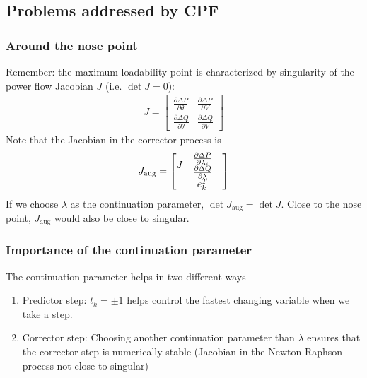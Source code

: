 \documentclass{beamer}
\begin{document}
\subsection{Problems addressed by CPF}


\begin{frame}
  \frametitle{Around the nose point}
Remember: the maximum loadability point is characterized by singularity of the power flow Jacobian $J$ (i.e. $\det J = 0$):
\begin{align}
  \label{eq:9}
  J = \begin{bmatrix}
  \frac{\partial \Delta P}{\partial \theta} & \frac{\partial \Delta P}{\partial V} \\
  \frac{\partial \Delta Q}{\partial \theta} & \frac{\partial \Delta Q}{\partial V}
  \end{bmatrix}
\end{align}
Note that the Jacobian in the corrector process is
\begin{align}
  \label{eq:9}
  J_\text{aug} = \begin{bmatrix}
  \begin{matrix} \vphantom{\begin{matrix} 0 \\ 0 \end{matrix}} 
  J 
 \end{matrix} & \begin{matrix} \frac{\partial \Delta P}{\partial \lambda_i} \\
  \frac{\partial \Delta Q}{\partial \lambda}
  \end{matrix} \\
   & e_k^T & 
  \end{bmatrix}
\end{align}
If we choose $\lambda$ as the continuation parameter, $\det J_\text{aug} = \det J$.
Close to the nose point, $J_\text{aug}$ would also be close to singular.
\end{frame}

\begin{frame}
  \frametitle{Importance of the continuation parameter}
  The continuation parameter helps in two different ways
  \begin{enumerate}
  \item Predictor step: $t_k = \pm 1$ helps control the fastest changing variable when we take a step.
  \item Corrector step: Choosing another continuation parameter than $\lambda$ ensures that the corrector step is numerically stable (Jacobian in the Newton-Raphson process not close to singular)
  \end{enumerate}
\end{frame}
\end{document}
